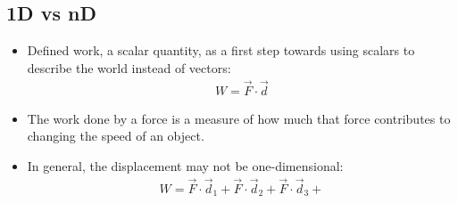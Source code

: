 \documentclass[aspectratio=169,
hyperref={colorlinks,urlcolor=blue}
]{beamer}
\begin{document}
\begin{frame}
\titlepage
\thispagestyle{empty}
\end{frame}











\subsection{1D vs nD}
\label{subsec:1dvsnd}
{
\begin{itemize}
\item Defined work, a scalar quantity, as a first step towards using scalars to describe the world instead of vectors:
\begin{align*}
W=\vec F\cdot \vec d
\end{align*}
\item The work done by a force is a measure of how much that force contributes to changing the speed of an object.
\item In general, the displacement may not be one-dimensional:
\begin{align*}
W=\vec F \cdot \vec d_1+\vec F \cdot \vec d_2+\vec F \cdot \vec d_3+
\end{align*}
\end{itemize}
}
\end{document}
